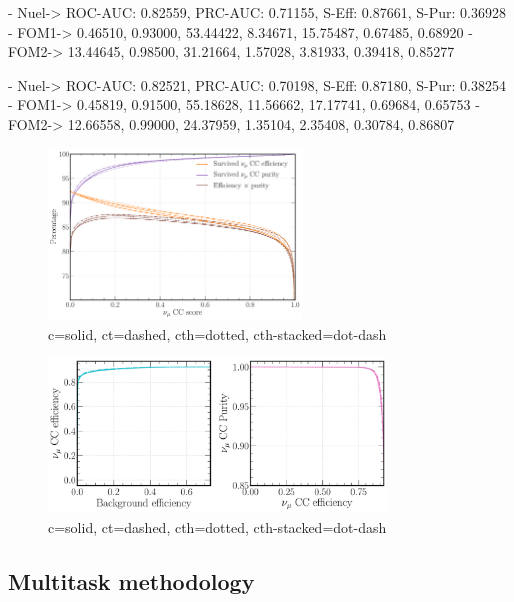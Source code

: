 - Nuel-> ROC-AUC: 0.82559, PRC-AUC: 0.71155, S-Eff: 0.87661, S-Pur: 0.36928
- FOM1-> 0.46510, 0.93000, 53.44422, 8.34671, 15.75487, 0.67485, 0.68920
- FOM2-> 13.44645, 0.98500, 31.21664, 1.57028, 3.81933, 0.39418, 0.85277

- Nuel-> ROC-AUC: 0.82521, PRC-AUC: 0.70198, S-Eff: 0.87180, S-Pur: 0.38254
- FOM1-> 0.45819, 0.91500, 55.18628, 11.56662, 17.17741, 0.69684, 0.65753
- FOM2-> 12.66558, 0.99000, 24.37959, 1.35104, 2.35408, 0.30784, 0.86807

\begin{figure} %
    \includegraphics[width=0.6\textwidth]{diagrams/7-cvn/chipsnet/channel_numu_eff_curves.pdf}
    \caption[channel numu eff curves short]
    {c=solid, ct=dashed, cth=dotted, cth-stacked=dot-dash}
    \label{fig:channel_numu_eff_curves}
\end{figure}

\begin{figure} %
    \includegraphics[width=0.8\textwidth]{diagrams/7-cvn/chipsnet/channel_numu_comp_curves.pdf}
    \caption[channel numu comp curves short]
    {c=solid, ct=dashed, cth=dotted, cth-stacked=dot-dash}
    \label{fig:channel_numu_comp_curves}
\end{figure}

\subsection{Multitask methodology} %
\label{sec:cvn_baseline_multi} %

